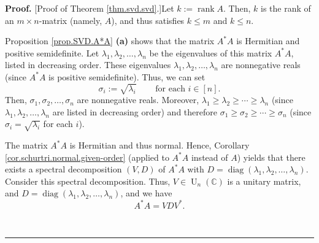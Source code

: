 \documentclass[numbers=enddot,12pt,final,onecolumn,notitlepage]{scrartcl}%
\numberwithin{exer}{subsection}
\theoremstyle{definition}
\newenvironment{proof}[1][Proof]{\noindent\textbf{#1.} }{\ \rule{0.5em}{0.5em}}
\begin{document}
\begin{proof}
[Proof of Theorem \ref{thm.svd.svd}.]Let $k:=\operatorname*{rank}A$. Then, $k$
is the rank of an $m\times n$-matrix (namely, $A$), and thus satisfies $k\leq
m$ and $k\leq n$.

Proposition \ref{prop.SVD.A*A} \textbf{(a)} shows that the matrix $A^{\ast}A$
is Hermitian and positive semidefinite. Let $\lambda_{1},\lambda_{2}%
,\ldots,\lambda_{n}$ be the eigenvalues of this matrix $A^{\ast}A$, listed in
decreasing order. These eigenvalues $\lambda_{1},\lambda_{2},\ldots
,\lambda_{n}$ are nonnegative reals (since $A^{\ast}A$ is positive
semidefinite). Thus, we can set%
\[
\sigma_{i}:=\sqrt{\lambda_{i}}\ \ \ \ \ \ \ \ \ \ \text{for each }i\in\left[
n\right]  .
\]
Then, $\sigma_{1},\sigma_{2},\ldots,\sigma_{n}$ are nonnegative reals.
Moreover, $\lambda_{1}\geq\lambda_{2}\geq\cdots\geq\lambda_{n}$ (since
$\lambda_{1},\lambda_{2},\ldots,\lambda_{n}$ are listed in decreasing order)
and therefore $\sigma_{1}\geq\sigma_{2}\geq\cdots\geq\sigma_{n}$ (since
$\sigma_{i}=\sqrt{\lambda_{i}}$ for each $i$).

The matrix $A^{\ast}A$ is Hermitian and thus normal. Hence, Corollary
\ref{cor.schurtri.normal.given-order} (applied to $A^{\ast}A$ instead of $A$)
yields that there exists a spectral decomposition $\left(  V,D\right)  $ of
$A^{\ast}A$ with $D=\operatorname*{diag}\left(  \lambda_{1},\lambda_{2}%
,\ldots,\lambda_{n}\right)  $. Consider this spectral decomposition. Thus,
$V\in\operatorname*{U}\nolimits_{n}\left(  \mathbb{C}\right)  $ is a unitary
matrix, and $D=\operatorname*{diag}\left(  \lambda_{1},\lambda_{2}%
,\ldots,\lambda_{n}\right)  $, and we have
\begin{equation}
A^{\ast}A=VDV^{\ast}. \label{pf.thm.svd.svd.A=}%
\end{equation}



\end{proof}
\end{document}
